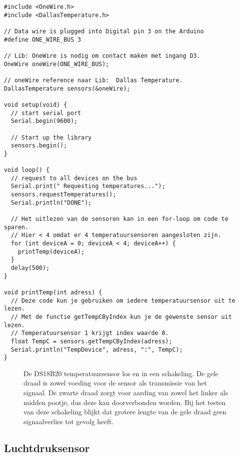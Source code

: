 \begin{verbatim}
#include <OneWire.h>
#include <DallasTemperature.h>

// Data wire is plugged into Digital pin 3 on the Arduino
#define ONE_WIRE_BUS 3

// Lib: OneWire is nodig om contact maken met ingang D3.
OneWire oneWire(ONE_WIRE_BUS);

// oneWire reference naar Lib:  Dallas Temperature.
DallasTemperature sensors(&oneWire);

void setup(void) {
  // start serial port
  Serial.begin(9600);

  // Start up the library
  sensors.begin();
}

void loop() {
  // request to all devices on the bus
  Serial.print(" Requesting temperatures...");
  sensors.requestTemperatures();
  Serial.println("DONE");

  // Het uitlezen van de sensoren kan in een for-loop om code te sparen.
  // Hier < 4 omdat er 4 temperatuursensoren aangesloten zijn.
  for (int deviceA = 0; deviceA < 4; deviceA++) {
    printTemp(deviceA);
  }
  delay(500);
}

void printTemp(int adress) {
  // Deze code kun je gebruiken om iedere temperatuursensor uit te lezen.
  // Met de functie getTempCByIndex kun je de gewenste sensor uit lezen.
  // Temperatuursensor 1 krijgt index waarde 0.
  float TempC = sensors.getTempCByIndex(adress);
  Serial.println("TempDevice", adress, ":", TempC);
}
\end{verbatim}


\begin{figure}
    \centering
    \subfloat[]{
        \texttt{[image: DS18B20\_A\_2]}
        \label{fig:DS18B20_A_2}}
    \hfill
    \caption{De DS18B20 temperatuursensor los en in een schakeling. De gele draad
    is zowel voeding voor de sensor als transmissie van het signaal. De zwarte
    draad zorgt voor aarding van zowel het linker als midden pootje, dus deze
    kan doorverbonden worden.
    Bij het testen van deze schakeling blijkt dat grotere lengte van de gele draad
    geen signaalverlies tot gevolg heeft.}
\end{figure}

\subsection{Luchtdruksensor}

